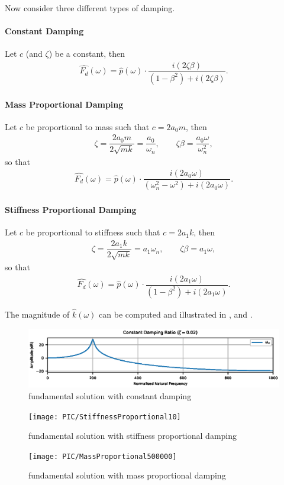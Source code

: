 Now consider three different types of damping.
\paragraph{Constant Damping}
Let $c$ (and $\zeta$) be a constant, then
\begin{gather}
\hat{F_d}\left(\omega\right)=\hat{p}\left(\omega\right)\cdot\dfrac{i\left(2\zeta\beta\right)}{\left(1-\beta^2\right)+i\left(2\zeta\beta\right)}.
\end{gather}
\paragraph{Mass Proportional Damping}
Let $c$ be proportional to mass such that $c=2a_0m$, then
\begin{gather}
\zeta=\dfrac{2a_0m}{2\sqrt{mk}}=\dfrac{a_0}{\omega_n},\qquad
\zeta\beta=\dfrac{a_0\omega}{\omega_n^2},
\end{gather}
so that
\begin{gather}
\hat{F_d}\left(\omega\right)=\hat{p}\left(\omega\right)\cdot\dfrac{i\left(2a_0\omega\right)}{\left(\omega_n^2-\omega^2\right)+i\left(2a_0\omega\right)}.
\end{gather}
\paragraph{Stiffness Proportional Damping}
Let $c$ be proportional to stiffness such that $c=2a_1k$, then
\begin{gather}
\zeta=\dfrac{2a_1k}{2\sqrt{mk}}=a_1\omega_n,\qquad
\zeta\beta=a_1\omega,
\end{gather}
so that
\begin{gather}
\hat{F_d}\left(\omega\right)=\hat{p}\left(\omega\right)\cdot\dfrac{i\left(2a_1\omega\right)}{\left(1-\beta^2\right)+i\left(2a_1\omega\right)}.
\end{gather}

The magnitude of $\hat{k}\left(\omega\right)$ can be computed and illustrated in ,  and .
\begin{figure}[H]
\centering
\includegraphics[]{PIC/ConstantProportional2000}
\caption{fundamental solution with constant damping}\label{fig:constant_damping}
\end{figure}

\begin{figure}[H]
\centering
\texttt{[image: PIC/StiffnessProportional10]}
\caption{fundamental solution with stiffness proportional damping}\label{fig:k_proportional}
\end{figure}

\begin{figure}[H]
\centering
\texttt{[image: PIC/MassProportional500000]}
\caption{fundamental solution with mass proportional damping}\label{fig:m_proportional}
\end{figure}